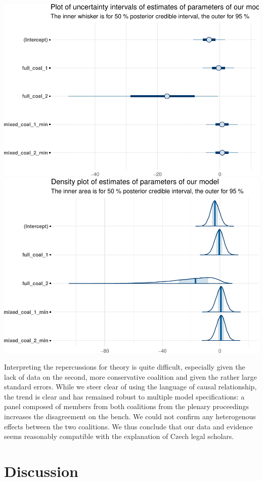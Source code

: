 \documentclass[
  11pt,
]{article}
\begin{document}
\includegraphics{dissents_article_files/figure-latex/interval_coalition-1.pdf}
\includegraphics{dissents_article_files/figure-latex/interval_coalition-2.pdf}

Interpreting the repercussions for theory is quite difficult, especially
given the lack of data on the second, more conservative coalition and
given the rather large standard errors. While we steer clear of using
the language of causal relationship, the trend is clear and has remained
robust to multiple model specifications: a panel composed of members
from both coalitions from the plenary proceedings increases the
disagreement on the bench. We could not confirm any heterogenous effects
between the two coalitions. We thus conclude that our data and evidence
seems reasonably compatible with the explanation of Czech legal
scholars.

\hypertarget{discussion}{%
\section{Discussion}\label{discussion}}
\end{document}

